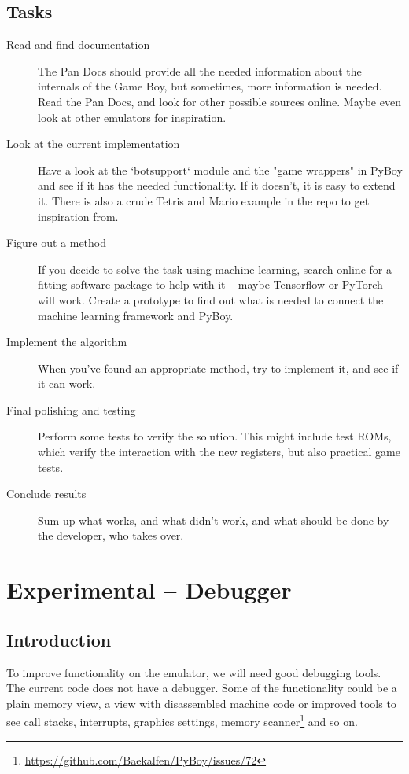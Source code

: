 \documentclass[11pt]{report} %
\begin{document}
\section*{Tasks}
\begin{description}
    \item [Read and find documentation]
        The Pan Docs should provide all the needed information about the internals of the Game Boy, but sometimes, more information is needed. Read the Pan Docs, and look for other possible sources online. Maybe even look at other emulators for inspiration.

    \item [Look at the current implementation]
        Have a look at the `botsupport` module and the "game wrappers" in PyBoy and see if it has the needed functionality. If it doesn't, it is easy to extend it. There is also a crude Tetris and Mario example in the repo to get inspiration from.

    \item [Figure out a method]
        If you decide to solve the task using machine learning, search online for a fitting software package to help with it -- maybe Tensorflow or PyTorch will work. Create a prototype to find out what is needed to connect the machine learning framework and PyBoy.

    \item [Implement the algorithm]
        When you've found an appropriate method, try to implement it, and see if it can work.

    \item [Final polishing and testing]
        Perform some tests to verify the solution. This might include test ROMs, which verify the interaction with the new registers, but also practical game tests.

    \item [Conclude results]
        Sum up what works, and what didn't work, and what should be done by the developer, who takes over.

\end{description}


\chapter*{Experimental -- Debugger}
\section*{Introduction}
To improve functionality on the emulator, we will need good debugging tools. The current code does not have a debugger. Some of the functionality could be a plain memory view, a view with disassembled machine code or improved tools to see call stacks, interrupts, graphics settings, memory scanner\footnote{\url{https://github.com/Baekalfen/PyBoy/issues/72}} and so on.
\end{document}
